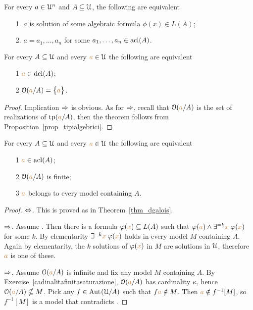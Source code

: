 \begin{exercise}
For every $a\in\EuScript U^n$ and $A\subseteq\EuScript U$, the following are equivalent
\begin{itemize}
\item[1.] $a$ is solution of some algebraic formula  $\phi(x)\in L(A)$;
\item[2.] $a=a_1,\dots,a_n$ for some $a_1,\dots,a_n\in\mathop{\rm acl}(A)$.\QED 
\end{itemize}
\end{exercise}


\begin{theorem}\label{thm_dgalois}
For every $A\subseteq\EuScript U$ and every ${\color{brown} a}\in\EuScript U$ the following are equivalent
\begin{itemize}
\item[1] ${\color{brown} a}\in\mathop{\rm dcl}(A)$;
\item[2] $\EuScript O({\color{brown} a}/A)=\big\{{\color{brown} a}\big\}$.
\end{itemize}
\end{theorem}

\begin{proof} 
Implication $\Rightarrow$ is obvious.
As for  $\Rightarrow$, recall that $\EuScript O({\color{brown} a}/A)$ is the set of realizations of ${\rm tp}({\color{brown} a}/A)$, 
then the theorem follows from Proposition~\ref{prop_tipialgebrici}.
\end{proof}


\begin{theorem}\label{thm_fmgalois}
For every $A\subseteq\EuScript U$ and every ${\color{brown} a}\in\EuScript U$ the following are equivalent
\begin{itemize}
\item[1] ${\color{brown} a}\in\mathop{\rm acl}(A)$;
\item[2] $\EuScript O({\color{brown} a}/A)$ is finite;
\item[3] ${\color{brown} a}$ belongs to every model containing $A$.
\end{itemize}
\end{theorem}

\begin{proof} $\Leftrightarrow$.
This is proved as in Theorem~\ref{thm_dgalois}.

$\Rightarrow$.
Assume .
Then there is a formula $\varphi({\color{brown} x})\subseteq L(A)$ such that $\varphi({\color{brown} a})\wedge\exists^{=k}{\color{brown} x}\;\varphi({\color{brown} x})$ for some $k$.
By elementarity $\exists^{=k}{\color{brown} x}\;\varphi({\color{brown} x})$ holds in every model $M$ containing $A$.
Again by elementarity, the $k$ solutions of $\varphi({\color{brown} x})$ in $M$ are solutions in $\EuScript U$, therefore ${\color{brown} a}$ is one of these.

$\Rightarrow$.
Assume $\EuScript O({\color{brown} a}/A)$ is infinite and fix any model $M$ containing $A$.
By Exercise~\ref{cadinalitafinitasaturazione}, $\EuScript O({\color{brown} a}/A)$  has cardinality $\kappa$, hence $\EuScript O({\color{brown} a}/A)\nsubseteq M$.
Pick any $f\in\textrm{Aut\kern.15ex}(\EuScript U/A)$ such that $f{\color{brown} a}\notin M$.
Then ${\color{brown} a}\notin f^{-1}[M]$, so $f^{-1}[M]$ is a model that contradicts .
\end{proof}

